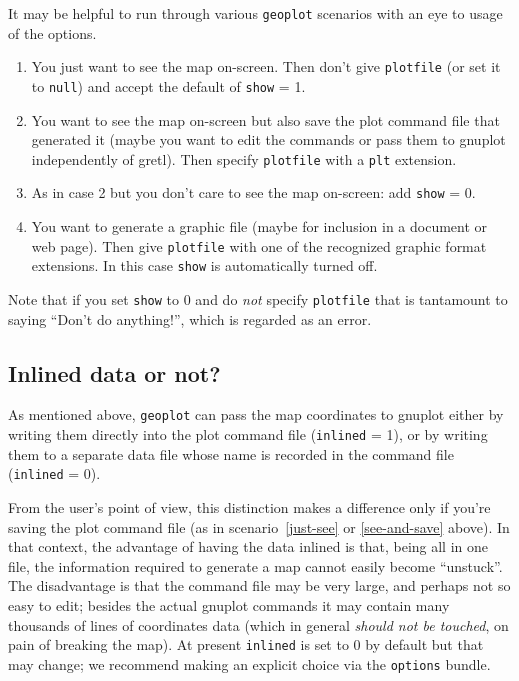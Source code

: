 \documentclass{article}
\begin{document}
It may be helpful to run through various \texttt{geoplot} scenarios
with an eye to usage of the options.

\begin{enumerate}
\item You just want to see the map on-screen. Then don't give
  \texttt{plotfile} (or set it to \texttt{null}) and accept the
  default of \texttt{show} = 1.\label{just-see}
\item You want to see the map on-screen but also save the plot command
  file that generated it (maybe you want to edit the commands or pass
  them to \textsf{gnuplot} independently of gretl). Then specify
  \texttt{plotfile} with a \texttt{plt} extension.\label{see-and-save}
\item As in case 2 but you don't care to see the map on-screen: add
  \texttt{show} = 0.
\item You want to generate a graphic file (maybe for inclusion in a
  document or web page). Then give \texttt{plotfile} with one of the
  recognized graphic format extensions. In this case \texttt{show} is
  automatically turned off.
\end{enumerate}

Note that if you set \texttt{show} to 0 and do \textit{not} specify
\texttt{plotfile} that is tantamount to saying ``Don't do anything!'',
which is regarded as an error.

\subsection{Inlined data or not?}

As mentioned above, \texttt{geoplot} can pass the map coordinates to
\textsf{gnuplot} either by writing them directly into the plot command
file (\texttt{inlined} = 1), or by writing them to a separate data
file whose name is recorded in the command file (\texttt{inlined} =
0).

From the user's point of view, this distinction makes a difference
only if you're saving the plot command file (as in
scenario~\ref{just-see} or \ref{see-and-save} above).  In that
context, the advantage of having the data inlined is that, being all
in one file, the information required to generate a map cannot easily
become ``unstuck''. The disadvantage is that the command file may be
very large, and perhaps not so easy to edit; besides the actual
\textsf{gnuplot} commands it may contain many thousands of lines of
coordinates data (which in general \textit{should not be touched}, on
pain of breaking the map). At present \texttt{inlined} is set to
0 by default but that may change; we recommend making an explicit
choice via the \texttt{options} bundle.
\end{document}

